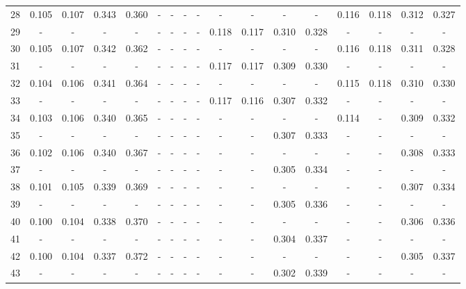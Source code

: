 \documentclass{report}
\begin{document}
\begin{appendices}
\begin{sidewaystable}
\begin{tabular}{|c|cccc|cccc|cccc|cccc|}
28 & 0.105 & 0.107 & 0.343 & 0.360 &   -   &   -   &   -   &   -   &   -   &   -   &   -   &   -   & 0.116 & 0.118 & 0.312 & 0.327\\
29 &   -   &   -   &   -   &   -   &   -   &   -   &   -   &   -   & 0.118 & 0.117 & 0.310 & 0.328 &   -   &   -   &   -   &   -  \\
30 & 0.105 & 0.107 & 0.342 & 0.362 &   -   &   -   &   -   &   -   &   -   &   -   &   -   &   -   & 0.116 & 0.118 & 0.311 & 0.328\\
31 &   -   &   -   &   -   &   -   &   -   &   -   &   -   &   -   & 0.117 & 0.117 & 0.309 & 0.330 &   -   &   -   &   -   &   -  \\
32 & 0.104 & 0.106 & 0.341 & 0.364 &   -   &   -   &   -   &   -   &   -   &   -   &   -   &   -   & 0.115 & 0.118 & 0.310 & 0.330\\
33 &   -   &   -   &   -   &   -   &   -   &   -   &   -   &   -   & 0.117 & 0.116 & 0.307 & 0.332 &   -   &   -   &   -   &   -  \\
34 & 0.103 & 0.106 & 0.340 & 0.365 &   -   &   -   &   -   &   -   &   -   &   -   &   -   &   -   & 0.114 &   -   & 0.309 & 0.332\\
35 &   -   &   -   &   -   &   -   &   -   &   -   &   -   &   -   &   -   &   -   & 0.307 & 0.333 &   -   &   -   &   -   &   -  \\
36 & 0.102 & 0.106 & 0.340 & 0.367 &   -   &   -   &   -   &   -   &   -   &   -   &   -   &   -   &   -   &   -   & 0.308 & 0.333\\
37 &   -   &   -   &   -   &   -   &   -   &   -   &   -   &   -   &   -   &   -   & 0.305 & 0.334 &   -   &   -   &   -   &   -  \\
38 & 0.101 & 0.105 & 0.339 & 0.369 &   -   &   -   &   -   &   -   &   -   &   -   &   -   &   -   &   -   &   -   & 0.307 & 0.334\\
39 &   -   &   -   &   -   &   -   &   -   &   -   &   -   &   -   &   -   &   -   & 0.305 & 0.336 &   -   &   -   &   -   &   -  \\
40 & 0.100 & 0.104 & 0.338 & 0.370 &   -   &   -   &   -   &   -   &   -   &   -   &   -   &   -   &   -   &   -   & 0.306 & 0.336\\
41 &   -   &   -   &   -   &   -   &   -   &   -   &   -   &   -   &   -   &   -   & 0.304 & 0.337 &   -   &   -   &   -   &   -  \\
42 & 0.100 & 0.104 & 0.337 & 0.372 &   -   &   -   &   -   &   -   &   -   &   -   &   -   &   -   &   -   &   -   & 0.305 & 0.337\\
43 &   -   &   -   &   -   &   -   &   -   &   -   &   -   &   -   &   -   &   -   & 0.302 & 0.339 &   -   &   -   &   -   &   -  \\

\end{tabular}
\end{sidewaystable}
\end{appendices}
\end{document}
